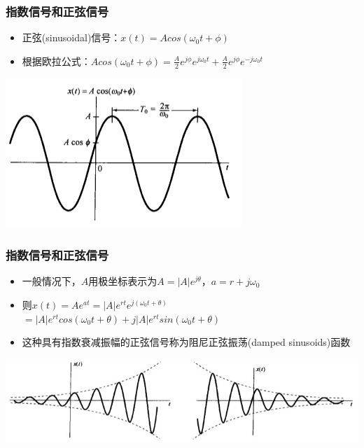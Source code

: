 \documentclass[CJKutf8,xcolor=pdftex,dvipsnames,table]{beamer}
\begin{document}
\begin{CJK*}{UTF8}{song}
  \begin{frame}
    \frametitle{指数信号和正弦信号}
    \begin{itemize}
    \item 正弦(sinusoidal)信号：$x(t)=Acos(\omega_0 t + \phi)$
    \item 根据欧拉公式：$Acos(\omega_0 t + \phi)=\frac{A}{2}e^{j\phi}e^{j\omega_0 t}+\frac{A}{2}e^{j\phi}e^{-j\omega_0 t}$
    \end{itemize}
    \begin{center}
      \includegraphics[scale=.5]{ccossinusoid}
    \end{center}  
  \end{frame} 

  \begin{frame}
    \frametitle{指数信号和正弦信号}
    \begin{itemize}
    \item 一般情况下，$A$用极坐标表示为$A=|A|e^{j\theta}$，$a=r+j\omega_0$
    \item 则$x(t)=Ae^{at}=|A|e^{rt}e^{j(\omega_0 t+\theta)}$
    \\ $=|A|e^{rt}cos(\omega_0 t + \theta)+j|A|e^{rt}sin(\omega_0 t + \theta)$
    \item 这种具有指数衰减振幅的正弦信号称为阻尼正弦振荡(damped sinusoids)函数
    \end{itemize}
    \begin{center}
      \includegraphics[scale=.5]{dampedsinusoids}
    \end{center}  
  \end{frame} 


\end{CJK*}
\end{document}
